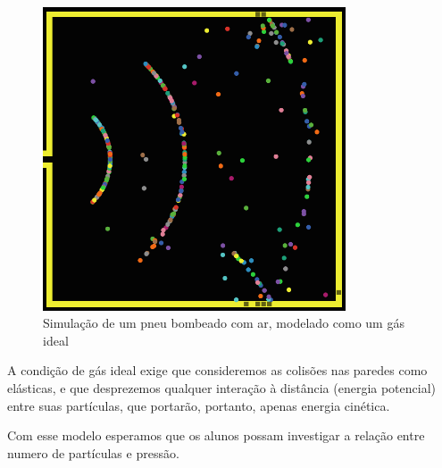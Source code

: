 \begin{figure}[!htb]
  \caption{Simulação de um pneu bombeado com ar, modelado como um gás ideal}
  \begin{center}
    \includegraphics[width=0.8\textwidth]{imagens/pneu-volume}
  \end{center}
  \label{fig:pneu-volume}
\end{figure}

A condição de gás ideal exige que consideremos as colisões nas paredes como elásticas, e que desprezemos qualquer interação à distância (energia potencial) entre suas partículas, que portarão, portanto, apenas energia cinética.

Com esse modelo esperamos que os alunos possam investigar a relação entre numero de partículas e pressão.